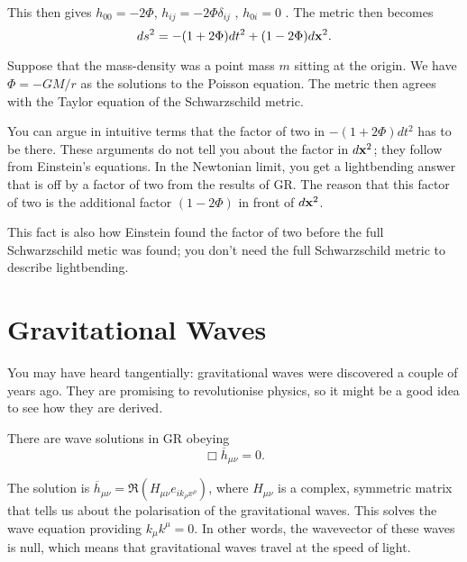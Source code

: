 This then gives $h_{00} = - 2 \Phi$, $h_{ij} = -2 \Phi \delta_{ij}$ , $h_{0i} = 0$ . 
The metric then becomes
\begin{equation}
  ds^2 = -(1 + 2 \Phi) dt^2 + (1 - 2 \Phi) d\vb{x}^2.
\end{equation}

\begin{example}[]
  Suppose that the mass-density was a point mass $m$ sitting at the origin.
  We have $\Phi = - G M /r$ as the solutions to the Poisson equation. The metric then agrees with the Taylor equation of the Schwarzschild metric.
\end{example}

\begin{remark}
  You can argue in intuitive terms that the factor of two in $-(1 + 2 \Phi)dt^2$ has to be there. These arguments do not tell you about the factor in $d\vb{x}^2$; they follow from Einstein's equations.
  In the Newtonian limit, you get a lightbending answer that is off by a factor of two from the results of GR.
  The reason that this factor of two is the additional factor $(1 - 2\Phi)$ in front of $d\vb{x}^2$.

  This fact is also how Einstein found the factor of two before the full Schwarzschild metic was found; you don't need the full Schwarzschild metric to describe lightbending.
\end{remark}

\section{Gravitational Waves}%
\label{sec:gravitational_waves}

You may have heard tangentially: gravitational waves were discovered a couple of years ago. They are promising to revolutionise physics, so it might be a good idea to see how they are derived.

There are wave solutions in GR obeying
\begin{equation}
  \Box \overline{h} _{\mu\nu} = 0.
\end{equation}

The solution is $\overline{h}_{\mu\nu} = \Re(H_{\mu\nu} e_{i k_{\rho} x^{\rho}})$, where $H_{\mu\nu}$ is a complex, symmetric matrix that tells us about the polarisation of the gravitational waves.
This solves the wave equation providing $k_{\mu} k^{\mu} = 0$. In other words, the wavevector of these waves is null, which means that gravitational waves travel at the speed of light.

